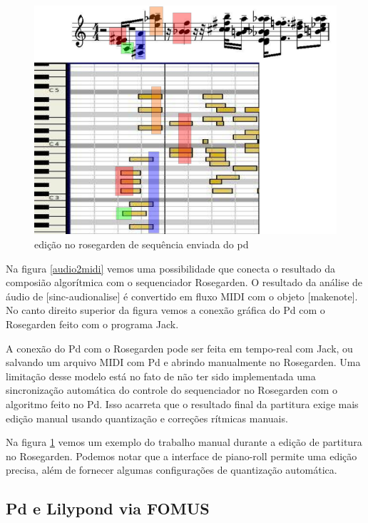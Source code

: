 \documentclass[draft]{ppgmus}
\begin{document}
\begin{figure}
\includegraphics[scale=.6]{teste-noquantize}
\caption{edição no rosegarden de sequência enviada do pd}
\label{noquantize}
\end{figure} 

Na figura \ref{audio2midi} vemos uma possibilidade que conecta
o resultado da composião algorítmica com o sequenciador Rosegarden.
O resultado da análise de áudio de [sinc-audionalise] é convertido
em fluxo MIDI com o objeto [makenote]. No canto direito superior da figura
vemos a conexão gráfica do Pd com o Rosegarden feito com o programa Jack.

A conexão do Pd com o Rosegarden pode ser feita em tempo-real com Jack, ou
salvando um arquivo MIDI com Pd e abrindo manualmente no Rosegarden.
Uma limitação desse modelo está no fato de não ter sido implementada uma sincronização
automática do controle do sequenciador no Rosegarden com o algoritmo
feito no Pd. Isso acarreta que o resultado final da partitura exige
mais edição manual usando quantização e correções rítmicas manuais.

Na figura \ref{noquantize} vemos um exemplo do trabalho manual durante a 
edição de partitura no Rosegarden. Podemos notar que a interface de piano-roll
permite uma edição precisa, além de fornecer algumas configurações de 
quantização automática.


\subsection{Pd e Lilypond via FOMUS}
\end{document}
